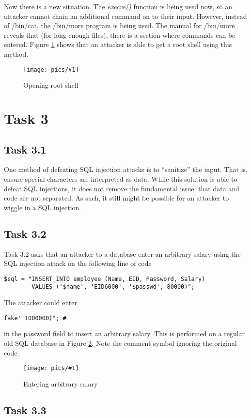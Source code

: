 \documentclass[11pt]{article}
\newcommand{\fig}[2]{ 
\begin{figure}[h]
	\centering
	\caption{#2}
	\texttt{[image: pics/\#1]}
	\label{fig:#1}
\end{figure} 
}
\newcommand{\exec}{\textit{execve()} }
\begin{document}
Now there is a new situation. The \exec function is being used now, so an attacker cannot chain an additional command on to their input. However, instead of /bin/cat, the /bin/more program is being used. The manual for /bin/more reveals that (for long enough files), there is a section where commands can be entered. Figure \ref{fig:task2.3} shows that an attacker is able to get a root shell using this method.

\fig{task2.3}{Opening root shell}

\newpage
\section*{Task 3}

\subsection*{Task 3.1}

One method of defeating SQL injection attacks is to ``sanitize'' the input. That is, ensure special characters are interpreted as data. While this solution is able to defeat SQL injections, it does not remove the fundamental issue: that data and code are not separated. As such, it still might be possible for an attacker to wiggle in a SQL injection.

\subsection*{Task 3.2}

Task 3.2 asks that an attacker to a database enter an arbitrary salary using the SQL injection attack on the following line of code
\begin{verbatim}
$sql = "INSERT INTO employee (Name, EID, Password, Salary)
        VALUES ('$name', 'EID6000', '$passwd', 80000)";	
\end{verbatim}
The attacker could enter
\begin{verbatim}
fake' 1000000)"; #
\end{verbatim}
in the password field to insert an arbitrary salary. This is performed on a regular old SQL database in Figure \ref{fig:task3.2}. Note the comment symbol ignoring the original code.

\fig{task3.2}{Entering arbitrary salary}

\subsection*{Task 3.3}
\end{document}
